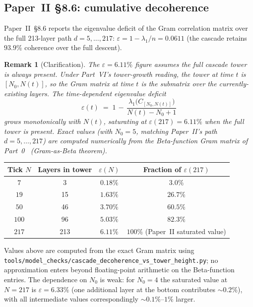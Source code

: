 \documentclass[12pt,a4paper]{article}
\newtheorem*{remark}{Remark}
\begin{document}
\subsection{Paper~II \S8.6: cumulative decoherence}

Paper~II~\S8.6 reports the eigenvalue deficit of the Gram correlation matrix
over the full 213-layer path $d = 5, \ldots, 217$:
$\varepsilon = 1 - \lambda_1/n = 0.0611$ (the cascade retains $93.9\%$
coherence over the full descent).

\begin{remark}[Clarification]
The $\varepsilon = 6.11\%$ figure assumes the full cascade tower is always
present. Under Part~VI's tower-growth reading, the tower at time $t$ is
$[N_0, N(t)]$, so the Gram matrix at time $t$ is the submatrix over the
currently-existing layers. The time-dependent eigenvalue deficit
\[
\varepsilon(t) \;=\; 1 \,-\, \frac{\lambda_1\bigl(C_{[N_0, N(t)]}\bigr)}{N(t) - N_0 + 1}
\]
grows monotonically with $N(t)$, saturating at $\varepsilon(217) = 6.11\%$
when the full tower is present. Exact values (with $N_0 = 5$, matching
Paper~II's path $d = 5, \ldots, 217$) are computed numerically from the
Beta-function Gram matrix of Part~0~\cite{part0} (Gram-as-Beta theorem).
\end{remark}

\begin{center}
\renewcommand{\arraystretch}{1.2}
\begin{tabular}{cccc}
\toprule
Tick $N$ & Layers in tower & $\varepsilon(N)$ & Fraction of $\varepsilon(217)$ \\
\midrule
$7$   & 3   & $0.18\%$ & $3.0\%$ \\
$19$  & 15  & $1.63\%$ & $26.7\%$ \\
$50$  & 46  & $3.70\%$ & $60.5\%$ \\
$100$ & 96  & $5.03\%$ & $82.3\%$ \\
$217$ & 213 & $6.11\%$ & $100\%$ (Paper~II saturated value) \\
\bottomrule
\end{tabular}
\end{center}

Values above are computed from the exact Gram matrix using
\texttt{tools/model\_checks/\allowbreak cascade\_decoherence\_\allowbreak vs\_tower\_\allowbreak height.py}; no approximation
enters beyond floating-point arithmetic on the Beta-function entries. The
dependence on $N_0$ is weak: for $N_0 = 4$ the saturated value at $N = 217$
is $\varepsilon = 6.33\%$ (one additional layer at the bottom contributes
$\sim 0.2\%$), with all intermediate values correspondingly $\sim 0.1\%$--$1\%$
larger.
\end{document}
